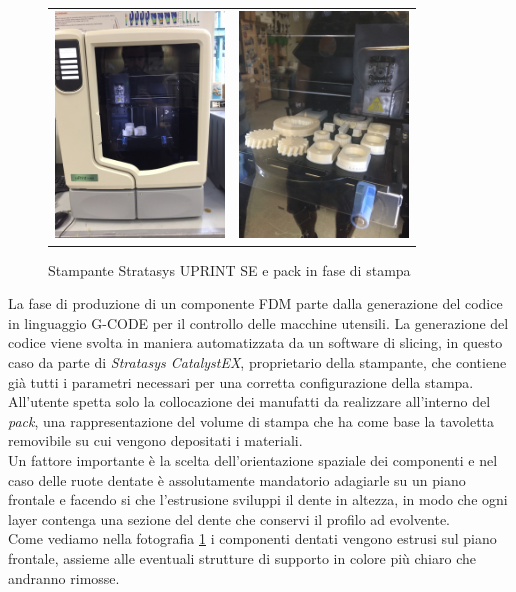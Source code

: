 \documentclass[%
corpo=11pt,
twoside,
 stile=classica,
oldstyle,
greek,%
]{toptesi}
\begin{document}
	\begin{figure}
		\centering
		\begin{tabular}{ll}
		\includegraphics[height=6cm,keepaspectratio]{image/uprint.jpg}
		&
		\includegraphics[height=6cm,keepaspectratio]{image/uprintp.jpg}
		\end{tabular}	
	\caption{Stampante Stratasys UPRINT SE e pack in fase di stampa}
	\label{fig:uprint}
	\end{figure}	
	La fase di produzione di un componente FDM parte dalla generazione del codice in linguaggio G-CODE per il controllo delle macchine utensili. 
	La generazione del codice viene svolta in maniera automatizzata da un software di slicing, in questo caso da parte di \textit{Stratasys CatalystEX},  proprietario della stampante, che contiene già tutti i parametri necessari per una corretta configurazione della stampa. \\
	All'utente spetta solo la collocazione dei manufatti da realizzare all'interno del \textit{pack}, una rappresentazione del volume di stampa che ha come base la tavoletta removibile su cui vengono depositati i materiali.\\
	 Un fattore importante è la scelta dell'orientazione spaziale dei componenti e nel caso delle ruote dentate è assolutamente mandatorio adagiarle su un piano frontale e facendo si che l'estrusione sviluppi il dente in altezza, in modo che ogni layer contenga una sezione del dente che conservi il profilo ad evolvente.\\ Come vediamo nella fotografia \ref{fig:uprint} i componenti dentati vengono estrusi sul piano frontale, assieme alle eventuali strutture di supporto in colore più chiaro che andranno rimosse. \\
\end{document}
